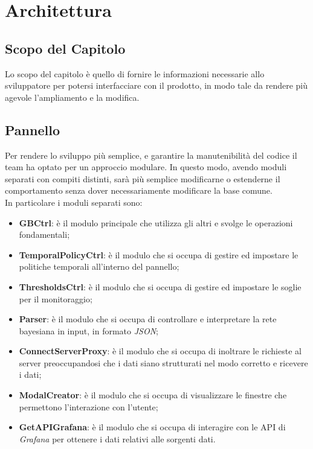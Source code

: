 \section{Architettura}\label{architettura}
\subsection{Scopo del Capitolo}
Lo scopo del capitolo è quello di fornire le informazioni necessarie allo sviluppatore per potersi interfacciare con il prodotto, in modo tale da rendere più agevole l'ampliamento e la modifica.

\subsection{Pannello}\label{archPannello}
Per rendere lo sviluppo più semplice, e garantire la manutenibilità del codice il team ha optato per un approccio modulare. In questo modo, avendo moduli separati con compiti distinti, sarà più semplice modificarne o estenderne il comportamento senza dover necessariamente modificare la base comune.\\
In particolare i moduli separati sono:
\begin{itemize}
	\item \textbf{GBCtrl}: è il modulo principale che utilizza gli altri e svolge le operazioni fondamentali;
	\item \textbf{TemporalPolicyCtrl}: è il modulo che si occupa di gestire ed impostare le politiche temporali all'interno del pannello;
	\item \textbf{ThresholdsCtrl}: è il modulo che si occupa di gestire ed impostare le soglie per il monitoraggio;
	\item \textbf{Parser}: è il modulo che si occupa di controllare e interpretare la rete bayesiana in input, in formato \textit{JSON};
	\item \textbf{ConnectServerProxy}: è il modulo che si occupa di inoltrare le richieste al server preoccupandosi che i dati siano strutturati nel modo corretto e ricevere i dati;
	\item \textbf{ModalCreator}: è il modulo che si occupa di visualizzare le finestre che permettono l'interazione con l'utente;
	\item \textbf{GetAPIGrafana}: è il modulo che si occupa di interagire con le API di \textit{Grafana} per ottenere i dati relativi alle sorgenti dati.
\end{itemize}

